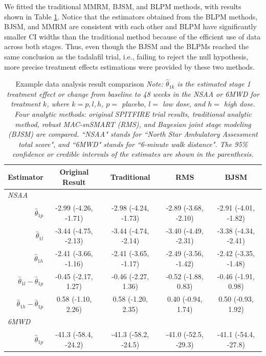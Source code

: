 We fitted the traditional \ac{MMRM}, \ac{BJSM}, and \ac{BLPM} methods, with results shown in Table \ref{tab:comp_longitudinal}. Notice that the estimators obtained from the \ac{BLPM} methods, \ac{BJSM}, and \ac{MMRM} are consistent with each other and \ac{BLPM} have significantly smaller \ac{CI} widths than the traditional method because of the efficient use of data across both stages. Thus, even though the \ac{BJSM} and the BLPMs reached the same conclusion as the tadalafil trial, i.e., failing to reject the null hypothesis, more precise treatment effects estimations were provided by these two methods.  


\begin{table} 
\caption{\label{tab:comp_longitudinal} \centering Example data analysis result comparison\protect\linebreak
\small
\textit{Note: $\widehat{\theta}_{1k}$ is the estimated stage 1 treatment effect or change from baseline to 48 weeks in the NSAA or 6MWD for treatment $k$, where $k = p,l,h$, $p = $ placebo, $l = $ low dose, and $h = $ high dose. Four analytic methods: original SPITFIRE trial results, traditional analytic method, robust MAC-snSMART (RMS), and  Bayesian joint stage modeling (BJSM) are compared. ``NSAA" stands for ``North Star Ambulatory Assessment total score", and ``6MWD" stands for ``6-minute walk distance". The 95\% confidence or credible intervals of the estimates are shown in the parenthesis.}}
\centering
\begin{tabular}{ccccc}
\hline
Estimator &  Original Result &  Traditional &  RMS  & BJSM \tabularnewline
\hline
\multicolumn{1}{l}{\textit{NSAA}} &&&&\\
\multicolumn{1}{r}{$\widehat{\theta}_{1p}$} &  -2.99 (-4.26, -1.71) &  -2.98 (-4.24, -1.73) &  -2.89 (-3.68, -2.10) &  -2.91 (-4.01, -1.82)  \tabularnewline 

\multicolumn{1}{r}{$\widehat{\theta}_{1l}$}  &  -3.44 (-4.75, -2.13) &  -3.44 (-4.74, -2.14) &  -3.40 (-4.49, -2.31) &  -3.38 (-4.34, -2.41)  \tabularnewline

\multicolumn{1}{r}{$\widehat{\theta}_{1h}$} &  -2.41 (-3.66, -1.16) &  -2.41 (-3.65, -1.17)  &  -2.49 (-3.56, -1.42) &   -2.42 (-3.35, -1.48) \tabularnewline

\multicolumn{1}{r}{$\widehat{\theta}_{1l} - \widehat{\theta}_{1p}$} &  -0.45 (-2.17, 1.27) &  -0.46 (-2.27, 1.36)  &  -0.52 (-1.88, 0.83) &  -0.46 (-1.91, 0.98)  \tabularnewline
\multicolumn{1}{r}{$\widehat{\theta}_{1h} - \widehat{\theta}_{1p}$} &  	0.58 (-1.10, 2.26) &  0.58 (-1.20, 2.35)  &  0.40 (-0.94, 1.74) &  0.50 (-0.93, 1.92)\tabularnewline
\hline
\multicolumn{1}{l}{\textit{6MWD}} &&&&\\
\multicolumn{1}{r}{$\widehat{\theta}_{1p}$} &  -41.3 (-58.4, -24.2) &  -41.3 (-58.2, -24.5)  &  -41.0 (-52.5, -29.3) &  -41.1 (-54.4, -27.8) \tabularnewline 


\end{tabular}
\end{table}
